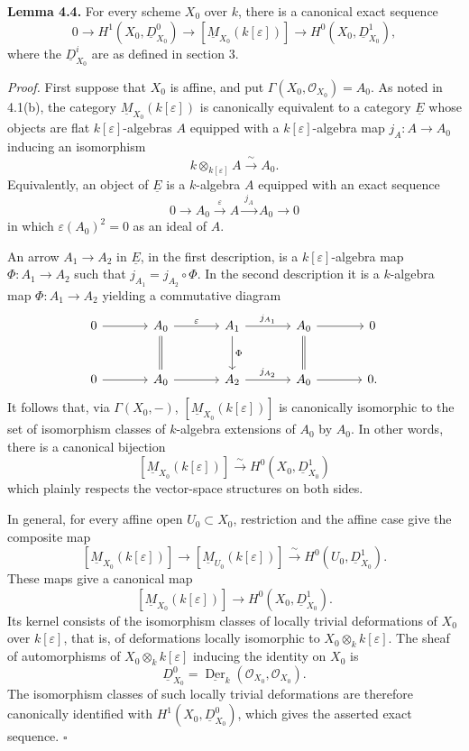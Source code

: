 
\medskip
\noindent\textbf{Lemma 4.4.}
For every scheme $X_0$ over $k$, there is a canonical exact sequence
\[
0\longrightarrow H^1(X_0,\underline D^0_{X_0})
\longrightarrow[\underline M_{X_0}(k[\varepsilon])]
\longrightarrow H^0(X_0,\underline D^1_{X_0}),
\]
where the $\underline D^i_{X_0}$ are as defined in section 3.

\medskip
\noindent\textit{Proof.}
First suppose that $X_0$ is affine, and put
$\Gamma(X_0,\mathcal O_{X_0})=A_0$. As noted in 4.1(b), the category
$\underline M_{X_0}(k[\varepsilon])$ is canonically equivalent to a
category $\underline E$ whose objects are flat $k[\varepsilon]$-algebras
$A$ equipped with a $k[\varepsilon]$-algebra map
$j_A:A\longrightarrow A_0$ inducing an isomorphism
\[
k\otimes_{k[\varepsilon]}A\xrightarrow{\ \sim\ }A_0.
\]
Equivalently, an object of $\underline E$ is a $k$-algebra $A$
equipped with an exact sequence
\[
0\longrightarrow A_0\xrightarrow{\ \varepsilon\ }A
\xrightarrow{\ j_A\ }A_0\longrightarrow0
\]
in which $\varepsilon(A_0)^2=0$ as an ideal of $A$.

An arrow $A_1\longrightarrow A_2$ in $\underline E$, in the first
description, is a $k[\varepsilon]$-algebra map
$\Phi:A_1\longrightarrow A_2$ such that
$j_{A_1}=j_{A_2}\circ\Phi$. In the second description it is a
$k$-algebra map $\Phi:A_1\longrightarrow A_2$ yielding a commutative
diagram
\[
\begin{tikzcd}[column sep=large,row sep=large]
0 \arrow[r]
& A_0 \arrow[r,"\varepsilon"] \arrow[d,equal]
& A_1 \arrow[r,"j_{A_1}"] \arrow[d,"\Phi"]
& A_0 \arrow[r] \arrow[d,equal]
& 0 \\
0 \arrow[r]
& A_0 \arrow[r]
& A_2 \arrow[r,"j_{A_2}"]
& A_0 \arrow[r]
& 0.
\end{tikzcd}
\]
It follows that, via $\Gamma(X_0,-)$,
$[\underline M_{X_0}(k[\varepsilon])]$ is canonically isomorphic to
the set of isomorphism classes of $k$-algebra extensions of $A_0$ by
$A_0$. In other words, there is a canonical bijection
\[
[\underline M_{X_0}(k[\varepsilon])]
\xrightarrow{\ \sim\ }H^0(X_0,\underline D^1_{X_0})
\]
which plainly respects the vector-space structures on both sides.


In general, for every affine open $U_0\subset X_0$, restriction and
the affine case give the composite map
\[
[\underline M_{X_0}(k[\varepsilon])]
\longrightarrow[\underline M_{U_0}(k[\varepsilon])]
\xrightarrow{\ \sim\ }H^0(U_0,\underline D^1_{X_0}).
\]
These maps give a canonical map
\[
[\underline M_{X_0}(k[\varepsilon])]
\longrightarrow H^0(X_0,\underline D^1_{X_0}).
\]
Its kernel consists of the isomorphism classes of locally trivial
deformations of $X_0$ over $k[\varepsilon]$, that is, of deformations
locally isomorphic to $X_0\otimes_k k[\varepsilon]$. The sheaf of
automorphisms of $X_0\otimes_k k[\varepsilon]$ inducing the identity
on $X_0$ is
\[
\underline D^0_{X_0}
=\underline{\operatorname{Der}}_k
  (\mathcal O_{X_0},\mathcal O_{X_0}).
\]
The isomorphism classes of such locally trivial deformations are
therefore canonically identified with
$H^1(X_0,\underline D^0_{X_0})$, which gives the asserted exact
sequence. \hfill$\square$
